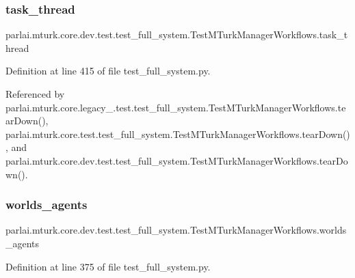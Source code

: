 \subsubsection{\texorpdfstring{task\+\_\+thread}{task\_thread}}
{\footnotesize\ttfamily parlai.\+mturk.\+core.\+dev.\+test.\+test\+\_\+full\+\_\+system.\+Test\+M\+Turk\+Manager\+Workflows.\+task\+\_\+thread}



Definition at line 415 of file test\+\_\+full\+\_\+system.\+py.



Referenced by parlai.\+mturk.\+core.\+legacy\+\_.\+test.\+test\+\_\+full\+\_\+system.\+Test\+M\+Turk\+Manager\+Workflows.\+tear\+Down(), parlai.\+mturk.\+core.\+test.\+test\+\_\+full\+\_\+system.\+Test\+M\+Turk\+Manager\+Workflows.\+tear\+Down(), and parlai.\+mturk.\+core.\+dev.\+test.\+test\+\_\+full\+\_\+system.\+Test\+M\+Turk\+Manager\+Workflows.\+tear\+Down().

\mbox{\label{classparlai_1_1mturk_1_1core_1_1dev_1_1test_1_1test__full__system_1_1TestMTurkManagerWorkflows_a1de4423b2be9da9ce2ecc239c242185f}} 
\subsubsection{\texorpdfstring{worlds\+\_\+agents}{worlds\_agents}}
{\footnotesize\ttfamily parlai.\+mturk.\+core.\+dev.\+test.\+test\+\_\+full\+\_\+system.\+Test\+M\+Turk\+Manager\+Workflows.\+worlds\+\_\+agents}



Definition at line 375 of file test\+\_\+full\+\_\+system.\+py.



